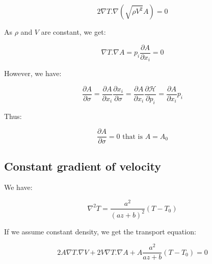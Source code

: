 \documentclass[main.tex]{subfiles}
\begin{document}
\begin{equation}
2 \nabla T . \nabla (\sqrt{\rho V^2} A) = 0
\end{equation}

As $\rho$ and $V$ are constant, we get:

\begin{equation}
\nabla T . \nabla A = p_i \frac{\partial A}{\partial x_i} = 0
\end{equation}

However, we have:

\begin{equation}
\frac{\partial A}{\partial \sigma} = \frac{\partial A}{\partial x_i} \frac{\partial x_i}{\partial \sigma} = \frac{\partial A}{\partial x_i} \frac{\partial \mathcal H}{\partial p_i} = \frac{\partial A}{\partial x_i} p_i
\end{equation}

Thus:

\begin{equation}
\frac{\partial A}{\partial \sigma} = 0 \text{ that is } A = A_0
\end{equation}

\subsection{Constant gradient of velocity}

We have:

\begin{equation}
\nabla^2 T = \frac{a^2}{(a z + b)^2} (T - T_0)
\end{equation}

If we assume constant density, we get the transport equation:

\begin{equation}
2 A \nabla T . \nabla V + 2 V \nabla T . \nabla A + A \frac{a^2}{a z + b} (T - T_0) = 0
\end{equation}
\end{document}
